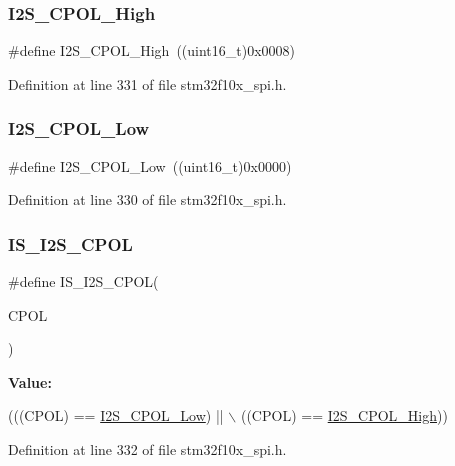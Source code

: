 \subsubsection{\texorpdfstring{I2\+S\+\_\+\+C\+P\+O\+L\+\_\+\+High}{I2S\_CPOL\_High}}
{\footnotesize\ttfamily \#define I2\+S\+\_\+\+C\+P\+O\+L\+\_\+\+High~((uint16\+\_\+t)0x0008)}



Definition at line 331 of file stm32f10x\+\_\+spi.\+h.

\mbox{\label{group___i2_s___clock___polarity_gae859a63575e4af3e007fc5123fa901ab}} 
\subsubsection{\texorpdfstring{I2\+S\+\_\+\+C\+P\+O\+L\+\_\+\+Low}{I2S\_CPOL\_Low}}
{\footnotesize\ttfamily \#define I2\+S\+\_\+\+C\+P\+O\+L\+\_\+\+Low~((uint16\+\_\+t)0x0000)}



Definition at line 330 of file stm32f10x\+\_\+spi.\+h.

\mbox{\label{group___i2_s___clock___polarity_ga6323375bf0b6fa6e2ee2a9ce6f9ef82f}} 
\subsubsection{\texorpdfstring{I\+S\+\_\+\+I2\+S\+\_\+\+C\+P\+OL}{IS\_I2S\_CPOL}}
{\footnotesize\ttfamily \#define I\+S\+\_\+\+I2\+S\+\_\+\+C\+P\+OL(\begin{DoxyParamCaption}\item[{}]{C\+P\+OL }\end{DoxyParamCaption})}

{\bfseries Value\+:}
\begin{DoxyCode}
(((CPOL) == \hyperlink{group___i2_s___clock___polarity_gae859a63575e4af3e007fc5123fa901ab}{I2S\_CPOL\_Low}) || \(\backslash\)
                           ((CPOL) == \hyperlink{group___i2_s___clock___polarity_gae26f7f9fbde299fbdc0b81a2cc38bfdb}{I2S\_CPOL\_High}))
\end{DoxyCode}


Definition at line 332 of file stm32f10x\+\_\+spi.\+h.


